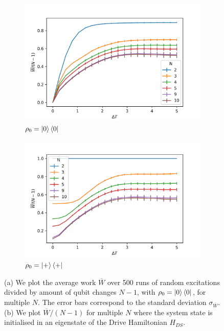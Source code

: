 \begin{figure}
	\centering
	\begin{subfigure}{0.4\textwidth}
		\centering
		\includegraphics[width=\textwidth]{img/dt_0}
		\caption{$\rho_0 = \ket{0}\bra{0}$}
		\label{dt_0}
	\end{subfigure}
	\begin{subfigure}{0.4\textwidth}
	\centering
	\includegraphics[width=\textwidth]{img/dt_eigen}
	\caption{$\rho_0 = \ket{+}\bra{+}$}
	\label{dt_eigen}
	\end{subfigure}
	\caption{(a) We plot the average work $\overline{W}$ over 500 runs of random excitations divided by amount of qubit changes $N - 1$, with $\rho_0 = \ket{0}\bra{0}$, for multiple $N$. The error bars correspond to the standard deviation $\sigma_{\overline{W}}$.
	(b) We plot $\overline{W}/(N-1)$ for multiple $N$ where the system state is initialised in an eigenstate of the Drive Hamiltonian $H_{DS}$.}
	\label{dt_dep}
\end{figure}